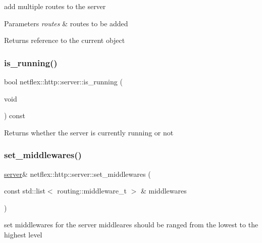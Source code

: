 add multiple routes to the server


\begin{DoxyParams}{Parameters}
{\em routes} & routes to be added \\
\hline
\end{DoxyParams}
\begin{DoxyReturn}{Returns}
reference to the current object 
\end{DoxyReturn}
\mbox{\label{classnetflex_1_1http_1_1server_a0b901ac09d2aa5a1597197c756307609}} 
\subsubsection{\texorpdfstring{is\+\_\+running()}{is\_running()}}
{\footnotesize\ttfamily bool netflex\+::http\+::server\+::is\+\_\+running (\begin{DoxyParamCaption}\item[{void}]{ }\end{DoxyParamCaption}) const}

\begin{DoxyReturn}{Returns}
whether the server is currently running or not 
\end{DoxyReturn}
\mbox{\label{classnetflex_1_1http_1_1server_a1f7b8f1cfb800f68d9ca4cfa1ed3aa08}} 
\subsubsection{\texorpdfstring{set\+\_\+middlewares()}{set\_middlewares()}}
{\footnotesize\ttfamily \hyperlink{classnetflex_1_1http_1_1server}{server}\& netflex\+::http\+::server\+::set\+\_\+middlewares (\begin{DoxyParamCaption}\item[{const std\+::list$<$ routing\+::middleware\+\_\+t $>$ \&}]{middlewares }\end{DoxyParamCaption})}

set middlewares for the server middleares should be ranged from the lowest to the highest level


